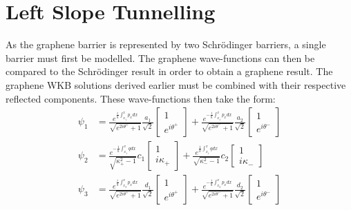 	\section{Left Slope Tunnelling}
	\label{WKB Potential Barrier - Left-Slope Tunneling}
		As the graphene barrier is represented by two Schr{\" o}dinger barriers, a single barrier must first be modelled. The graphene wave-functions can then be compared to the Schr{\" o}dinger result in order to obtain a graphene result.	The graphene WKB solutions derived earlier must be combined with their respective reflected components. These wave-functions then take the form:
		\begin{align}
			\psi_{1}&=\frac{e^{\frac{i}{h}\int^{x}_{x_{1}} p_{x}dx}}{\sqrt{e^{2i\theta^{+}}+1}}\frac{a_{1}}{\sqrt{2}}
			\left[\begin{array}{cc}
				1\\
				e^{i\theta^{+}}
			\end{array}\right]+
			\frac{e^{-\frac{i}{h}\int^{x}_{x_{1}} p_{x}dx}}{\sqrt{e^{2i\theta^{-}}+1}}\frac{a_{2}}{\sqrt{2}}
			\left[\begin{array}{cc}
				1\\
				e^{i\theta^{-}}
			\end{array}\right]\\
			\psi_{2}&=\frac{e^{-\frac{1}{h}\int^{x}_{x_1} qdx}}{\sqrt{\kappa_{+}^{2}-1}}c_{1}
			\left[\begin{array}{cc}
				1\\
				i\kappa_{+}
			\end{array}\right]
			+\frac{e^{\frac{1}{h}\int^{x}_{x_1} qdx}}{\sqrt{\kappa_{-}^{2}-1}}c_{2}
			\left[\begin{array}{cc}
				1\\
				i\kappa_{-}
			\end{array}\right]\\
			\psi_{3}&=\frac{e^{\frac{i}{h}\int^{x}_{x_{2}} p_{x}dx}}{\sqrt{e^{2i\theta^{+}}+1}}\frac{d_{1}}{\sqrt{2}}
			\left[\begin{array}{cc}
				1\\
				e^{i\theta^{+}}
			\end{array}\right]+
			\frac{e^{-\frac{i}{h}\int^{x}_{x_{2}} p_{x}dx}}{\sqrt{e^{2i\theta^{-}}+1}}\frac{d_{2}}{\sqrt{2}}
			\left[\begin{array}{cc}
				1\\
				e^{i\theta^{-}}
			\end{array}\right]
			\label{wkb-wave-functions-slope}
		\end{align}
